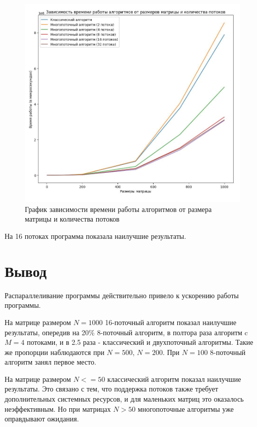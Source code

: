 \FloatBarrier
\begin{figure}[h]
	\begin{center}
		\includegraphics[width=\linewidth]{inc/result.jpg}
	\end{center}
	\caption{График зависимости времени работы алгоритмов от размера матрицы и количества потоков}
\end{figure}
\FloatBarrier

На 16 потоках программа показала наилучшие результаты.

\section{Вывод}
Распараллеливание программы действительно привело к ускорению работы программы.

На матрице размером $N=1000$ 16-поточный алгоритм показал наилучшие результаты, опередив на 20\% 8-поточный алгоритм, в полтора раза
алгоритм c $M=4$ потоками, и в 2.5 раза - классический и двухпоточный алгоритмы. Такие же пропорции наблюдаются
при $N=500$, $N=200$. При $N=100$ 8-поточный алгоритм занял первое место.

На матрице размером $N <= 50$ классический алгоритм показал наилучшие результаты. Это связано с тем,
что поддержка потоков также требует дополнительных системных ресурсов, и для маленьких матриц это оказалось
неэффективным. Но при матрицах $N > 50$ многопоточные алгоритмы уже оправдывают ожидания.

